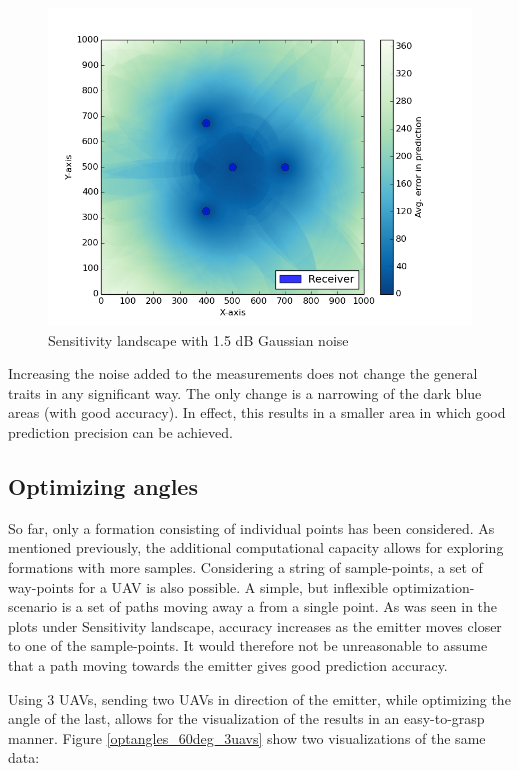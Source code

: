 \documentclass[10pt,a4paper]{book}
\begin{document}
\newpage

\begin{figure}[H]
\centering
\includegraphics[width=120mm]{slandscape_15_twolayers.png}
\caption{Sensitivity landscape with 1.5 dB Gaussian noise}
\label{slandscape_twolayer_noise1.5}
\end{figure}

Increasing the noise added to the measurements does not change the general traits in any significant way. The only change is a narrowing of the dark blue areas (with good accuracy). In effect, this results in a smaller area in which good prediction precision can be achieved.



\subsection{Optimizing angles}
\label{R_FL_OPT_ANGLES}

So far, only a formation consisting of individual points has been considered. As mentioned previously, the additional computational capacity allows for exploring formations with more samples. Considering a string of sample-points, a set of way-points for a \gls{UAV} is also possible. A simple, but inflexible optimization-scenario is a set of paths moving away a from a single point. As was seen in the plots under Sensitivity landscape, accuracy increases as the emitter moves closer to one of the sample-points. It would therefore not be unreasonable to assume that a path moving towards the emitter gives good prediction accuracy. 

\newpage

Using 3 \glspl{UAV}, sending two \glspl{UAV} in direction of the emitter, while optimizing the angle of the last, allows for the visualization of the results in an easy-to-grasp manner. Figure \ref{optangles_60deg_3uavs} show two visualizations of the same data:
\end{document}
